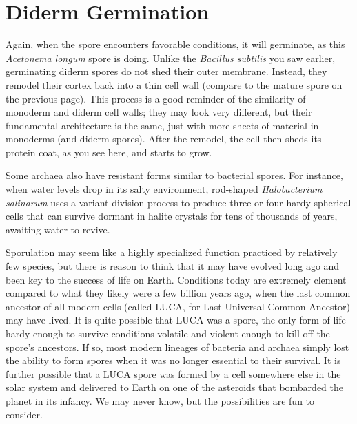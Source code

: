 \documentclass[]{tufte-book}
\begin{document}
\section{Diderm Germination}\label{diderm-germination}

Again, when the spore encounters favorable conditions, it will
germinate, as this \emph{Acetonema longum} spore is doing. Unlike the
\emph{Bacillus subtilis} you saw earlier, germinating diderm spores do
not shed their outer membrane. Instead, they remodel their cortex back
into a thin cell wall (compare to the mature spore on the previous
page). This process is a good reminder of the similarity of monoderm and
diderm cell walls; they may look very different, but their fundamental
architecture is the same, just with more sheets of material in monoderms
(and diderm spores). After the remodel, the cell then sheds its protein
coat, as you see here, and starts to grow.

Some archaea also have resistant forms similar to bacterial spores. For
instance, when water levels drop in its salty environment, rod-shaped
\emph{Halobacterium salinarum} uses a variant division process to
produce three or four hardy spherical cells that can survive dormant in
halite crystals for tens of thousands of years, awaiting water to
revive.

Sporulation may seem like a highly specialized function practiced by
relatively few species, but there is reason to think that it may have
evolved long ago and been key to the success of life on Earth.
Conditions today are extremely clement compared to what they likely were
a few billion years ago, when the last common ancestor of all modern
cells (called LUCA, for Last Universal Common Ancestor) may have lived.
It is quite possible that LUCA was a spore, the only form of life hardy
enough to survive conditions volatile and violent enough to kill off the
spore's ancestors. If so, most modern lineages of bacteria and archaea
simply lost the ability to form spores when it was no longer essential
to their survival. It is further possible that a LUCA spore was formed
by a cell somewhere else in the solar system and delivered to Earth on
one of the asteroids that bombarded the planet in its infancy. We may
never know, but the possibilities are fun to consider.
\end{document}

